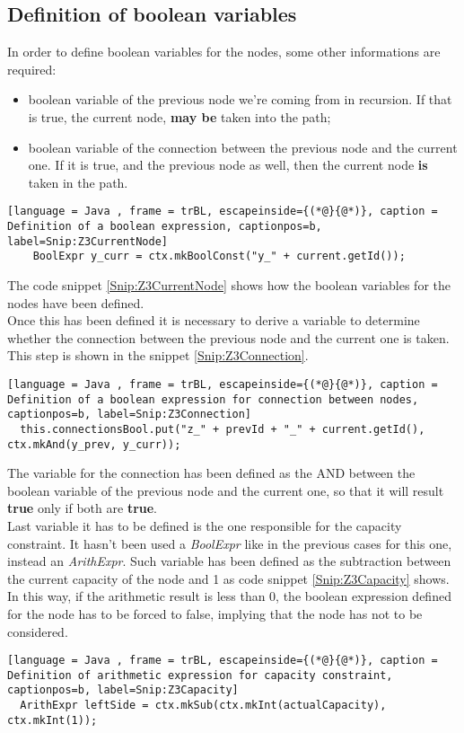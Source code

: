\subsection{Definition of boolean variables}
In order to define boolean variables for the nodes, some other informations are required:
\begin{itemize}
  \item boolean variable of the previous node we're coming from in recursion. If that is true, the current node, \textbf{may be} taken into the path;
  \item boolean variable of the connection between the previous node and the current one. If it is true, and the previous node as well, then the current node \textbf{is} taken in the path.
\end{itemize}
\begin{lstlisting}[language = Java , frame = trBL, escapeinside={(*@}{@*)}, caption = Definition of a boolean expression, captionpos=b, label=Snip:Z3CurrentNode]
	BoolExpr y_curr = ctx.mkBoolConst("y_" + current.getId());
\end{lstlisting}
The code snippet \ref{Snip:Z3CurrentNode} shows how the boolean variables for the nodes have been defined.\\
Once this has been defined it is necessary to derive a variable to determine whether the connection between the previous node and the current one is taken. This step is shown in the snippet \ref{Snip:Z3Connection}.
\begin{lstlisting}[language = Java , frame = trBL, escapeinside={(*@}{@*)}, caption = Definition of a boolean expression for connection between nodes, captionpos=b, label=Snip:Z3Connection]
  this.connectionsBool.put("z_" + prevId + "_" + current.getId(), ctx.mkAnd(y_prev, y_curr));
\end{lstlisting}
The variable for the connection has been defined as the AND between the boolean variable of the previous node and the current one, so that it will result \textbf{true} only if both are \textbf{true}.\\
Last variable it has to be defined is the one responsible for the capacity constraint. It hasn't been used a \textit{BoolExpr} like in the previous cases for this one, instead an \textit{ArithExpr}. Such variable has been defined as the subtraction between the current capacity of the node and 1 as code snippet \ref{Snip:Z3Capacity} shows. In this way, if the arithmetic result is less than 0, the boolean expression defined for the node has to be forced to false, implying that the node has not to be considered.
\begin{lstlisting}[language = Java , frame = trBL, escapeinside={(*@}{@*)}, caption = Definition of arithmetic expression for capacity constraint, captionpos=b, label=Snip:Z3Capacity]
  ArithExpr leftSide = ctx.mkSub(ctx.mkInt(actualCapacity), ctx.mkInt(1));
\end{lstlisting}

